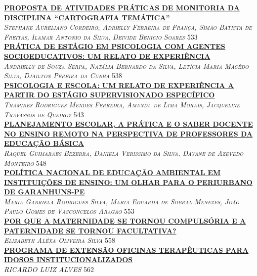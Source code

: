 \noindent \textsc{\hyperlink{trabalhos/251305.pdf.1}{\textbf{PROPOSTA DE ATIVIDADES PRÁTICAS DE MONITORIA DA DISCIPLINA “CARTOGRAFIA TEMÁTICA”}}}\\ 
\noindent \textsc{\textit{Stephane Aureliano Cordeiro, Adrielly Ferreira de França, Simão Batista de Freitas, Ilamar Antonio da Silva, Deivide Benicio Soares}} \hfill 533\\ 

\noindent \textsc{\hyperlink{trabalhos/250774.pdf.1}{\textbf{PRÁTICA DE ESTÁGIO EM PSICOLOGIA COM AGENTES SOCIOEDUCATIVOS: UM RELATO DE EXPERIÊNCIA}}}\\ 
\noindent \textsc{\textit{Andrielly de Souza Serpa, Natália Bernardo da Silva, Letícia Maria Macêdo Silva, Djailton Pereira da Cunha}} \hfill 538\\ 

\noindent \textsc{\hyperlink{trabalhos/251604.pdf.1}{\textbf{PSICOLOGIA E ESCOLA: UM RELATO DE EXPERIÊNCIA A PARTIR DO ESTÁGIO SUPERVISIONADO ESPECÍFICO}}}\\ 
\noindent \textsc{\textit{Thamires Rodrigues Mendes Ferreira, Amanda de Lima Morais, Jacqueline Travassos de Queiroz}} \hfill 543\\ 

\noindent \textsc{\hyperlink{trabalhos/250204.pdf.1}{\textbf{PLANEJAMENTO ESCOLAR, A PRÁTICA E O SABER DOCENTE NO ENSINO REMOTO NA PERSPECTIVA DE PROFESSORES DA EDUCAÇÃO BÁSICA}}}\\ 
\noindent \textsc{\textit{Raquel Guimarães Bezerra, Daniela Verissimo da Silva, Dayane de Azevedo Monteiro}} \hfill 548\\ 

\noindent \textsc{\hyperlink{trabalhos/250255.pdf.1}{\textbf{POLÍTICA NACIONAL DE EDUCAÇÃO AMBIENTAL EM INSTITUIÇÕES DE ENSINO: UM OLHAR PARA O PERIURBANO DE GARANHUNS-PE}}}\\ 
\noindent \textsc{\textit{Maria Gabriela Rodrigues Silva, Maria Eduarda de Sobral Menezes, João Paulo Gomes de Vasconcelos Aragão}} \hfill 553\\ 

\noindent \textsc{\hyperlink{trabalhos/241296.pdf.1}{\textbf{POR QUE A MATERNIDADE SE TORNOU COMPULSÓRIA E A PATERNIDADE SE TORNOU FACULTATIVA?}}}\\ 
\noindent \textsc{\textit{Elizabeth Aléxa Oliveira Silva}} \hfill 558\\ 

\noindent \textsc{\hyperlink{trabalhos/249444.pdf.1}{\textbf{PROGRAMA DE EXTENSÃO OFICINAS TERAPÊUTICAS PARA IDOSOS INSTITUCIONALIZADOS}}}\\ 
\noindent \textsc{\textit{RICARDO LUIZ ALVES}} \hfill 562\\ 

